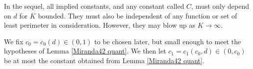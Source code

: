 \documentclass[reqno,10pt]{amsart}
\theoremstyle{definition}
\numberwithin{equation}{section}
\begin{document}

In the sequel, all implied constants, and any constant called $C$, must only depend on $d$ for $K$ bounded.
They must also be independent of any function or set of least perimeter in consideration.
However, they may blow up as $K \to \infty$.

We fix $c_0 = c_0(d) \in (0, 1)$ to be chosen later, but small enough to meet the hypotheses of Lemma \ref{Miranda42 quant}.
We then let $c_1 = c_1(c_0, d) \in (0, c_0)$ be at most the constant obtained from Lemma \ref{Miranda42 quant}.
\end{document}
